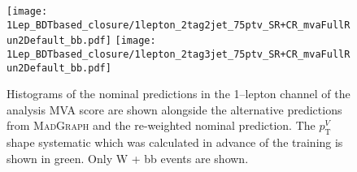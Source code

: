 \begin{figure}[ht!]
  \centering
  \texttt{[image: 1Lep\_BDTbased\_closure/1lepton\_2tag2jet\_75ptv\_SR+CR\_mvaFullRun2Default\_bb.pdf]}
  \texttt{[image: 1Lep\_BDTbased\_closure/1lepton\_2tag3jet\_75ptv\_SR+CR\_mvaFullRun2Default\_bb.pdf]}  \\
  \caption[Nominal, alternative and re-weighted nominal predictions of $W+$jets
  events (1--lepton channel, MVA score).]{Histograms of the nominal predictions
    in the 1--lepton channel of the analysis MVA score are shown alongside the
    alternative predictions from \textsc{MadGraph} and the re-weighted nominal
    prediction. The $p_{\mathrm{T}}^V$ shape systematic which was calculated in advance of
    the training is shown in green. Only W + bb events are shown.}
    \label{fig:wjets_1lep_FullRun2MVA_BDTrClosure}
\end{figure}